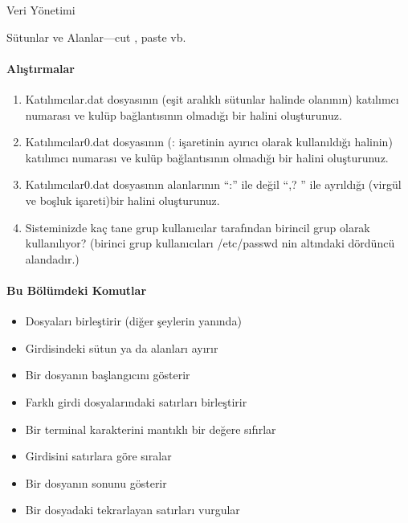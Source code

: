\begin{section}{Veri Yönetimi}
\begin{subsection}{Sütunlar ve Alanlar—cut , paste vb.}
\paragraph{{\Huge{\PencilLeftDown}}Alıştırmalar}{
\begin{enumerate}
 \item Katılımcılar.dat dosyasının (eşit aralıklı sütunlar halinde olanının) katılımcı numarası ve kulüp bağlantısının olmadığı bir halini oluşturunuz.
 \item Katılımcılar0.dat dosyasının (: işaretinin ayırıcı olarak kullanıldığı halinin) katılımcı numarası ve kulüp bağlantısının olmadığı bir halini oluşturunuz.
 \item Katılımcılar0.dat dosyasının alanlarının “:” ile değil “,? ” ile ayrıldığı (virgül ve boşluk işareti)bir halini oluşturunuz.
 \item Sisteminizde kaç tane grup kullanıcılar tarafından birincil grup olarak kullanılıyor? (birinci grup kullanıcıları /etc/passwd nin altındaki dördüncü alandadır.)
\end{enumerate}}

\paragraph{Bu Bölümdeki Komutlar}{
\begin{itemize}
\item[cat]Dosyaları birleştirir (diğer şeylerin yanında)
\item[cut]Girdisindeki sütun ya da alanları ayırır
\item[head]Bir dosyanın başlangıcını gösterir
\item[paste]Farklı girdi dosyalarındaki satırları birleştirir
\item[reset]Bir terminal karakterini mantıklı bir değere sıfırlar
\item[sort]Girdisini satırlara göre sıralar
\item[tail]Bir dosyanın sonunu gösterir
\item[uniq]Bir dosyadaki tekrarlayan satırları vurgular
\end{itemize}}


\end{subsection}
\end{section}
